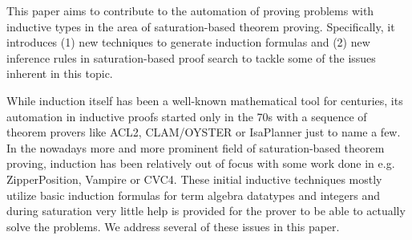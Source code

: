 This paper aims to contribute to the automation of proving problems with inductive types in the area of saturation-based theorem proving. Specifically, it introduces (1) new techniques to generate induction formulas and (2) new inference rules in saturation-based proof search to tackle some of the issues inherent in this topic.

While induction itself has been a well-known mathematical tool for centuries, its automation in inductive proofs started only in the 70s with a sequence of theorem provers like ACL2, CLAM/OYSTER or IsaPlanner just to name a few. In the nowadays more and more prominent field of saturation-based theorem proving, induction has been relatively out of focus with some work done in e.g. ZipperPosition, Vampire or CVC4. These initial inductive techniques mostly utilize basic induction formulas for term algebra datatypes and integers and during saturation very little help is provided for the prover to be able to actually solve the problems. We address several of these issues in this paper.

